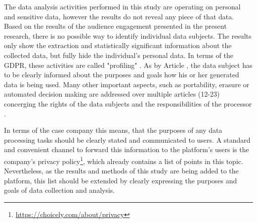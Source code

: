 The data analysis activities performed in this study are operating on personal and sensitive data, however the results do not reveal any piece of that data. Based on the results of the audience engagement presented in the present research, there is no possible way to identify individual data subjects. The results only show the extraction and statistically significant information about the collected data, but fully hide the individual's personal data. In terms of the GDPR, these activities are called "profiling" \cite{gdpr}. As by Article \cite{gdpr}, the data subject has to be clearly informed about the purposes and goals how his or her generated data is being used. Many other important aspects, such as portability, erasure or automated decision making are addressed over multiple articles (12-23) concerging the rights of the data subjects and the responsibilities of the processor \cite{gdpr}.

In terms of the case company this means, that the purposes of any data processing tasks should be clearly stated and communicated to users. A standard and convenient channel to forward this information to the platform's users is the company's privacy policy\footnote{\url{https://choicely.com/about/privacy}}, which already contains a list of points in this topic. Nevertheless, as the results and methods of this study are being added to the platform, this list should be extended by clearly expressing the purposes and goals of data collection and analysis.

